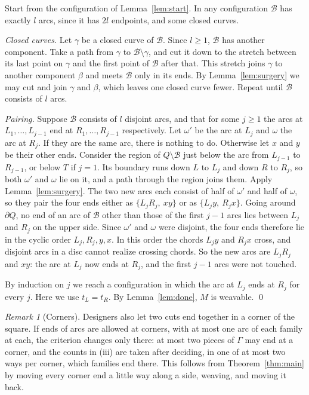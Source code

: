 \documentclass[11pt,a4paper]{article}
\theoremstyle{definition}
\theoremstyle{remark}
\newtheorem{remark}[theorem]{Remark}
\newcommand{\B}{\mathcal{B}}
\newcommand{\bd}{\partial}
\begin{document}
Start from the configuration of Lemma~\ref{lem:start}. In any
configuration $\B$ has exactly $l$ arcs, since it has $2l$ endpoints, and
some closed curves.

\emph{Closed curves.} Let $\gamma$ be a closed curve of $\B$. Since
$l\ge1$, $\B$ has another component. Take a path from $\gamma$ to
$\B\setminus\gamma$, and cut it down to the stretch between its last
point on $\gamma$ and the first point of $\B$ after that. This stretch
joins $\gamma$ to another component $\beta$ and meets $\B$ only in its
ends. By Lemma~\ref{lem:surgery} we may cut and join $\gamma$ and $\beta$,
which leaves one closed curve fewer. Repeat until $\B$ consists of $l$
arcs.

\emph{Pairing.} Suppose $\B$ consists of $l$ disjoint arcs, and that for
some $j\ge 1$ the arcs at $L_1,\dots,L_{j-1}$ end at
$R_1,\dots,R_{j-1}$ respectively. Let $\omega'$ be the arc at $L_j$ and
$\omega$ the arc at $R_j$. If they are the same arc, there is nothing to
do. Otherwise let $x$ and $y$ be their other ends. Consider the region of
$Q\setminus\B$ just below the arc from $L_{j-1}$ to $R_{j-1}$, or below $T$
if $j=1$. Its boundary runs down $L$ to $L_j$ and down $R$ to $R_j$, so
both $\omega'$ and $\omega$ lie on it, and a path through the region joins
them. Apply Lemma~\ref{lem:surgery}. The two new arcs each consist of half
of $\omega'$ and half of $\omega$, so they pair the four ends either as
$\{L_jR_j,\ xy\}$ or as $\{L_jy,\ R_jx\}$. Going around $\bd Q$, no end of
an arc of $\B$ other than those of the first $j-1$ arcs lies between $L_j$
and $R_j$ on the upper side. Since $\omega'$ and $\omega$ were disjoint, the
four ends therefore lie in the cyclic order $L_j,R_j,y,x$. In this order
the chords $L_jy$ and $R_jx$ cross, and disjoint arcs in a disc cannot
realize crossing chords. So the new arcs are $L_jR_j$ and $xy$: the arc at
$L_j$ now ends at $R_j$, and the first $j-1$ arcs were not touched.

By induction on $j$ we reach a configuration in which the arc at $L_j$
ends at $R_j$ for every $j$. Here we use $t_L=t_R$. By
Lemma~\ref{lem:done}, $M$ is weavable. \qed

\begin{remark}[Corners]
Designers also let two cuts end together in a corner of the square. If
ends of arcs are allowed at corners, with at most one arc of each family at
each, the criterion changes only there: at most two pieces of $\Gamma$ may
end at a corner, and the counts in (iii) are taken after deciding, in one
of at most two ways per corner, which families end there. This follows from
Theorem~\ref{thm:main} by moving every corner end a little way along a
side, weaving, and moving it back.
\end{remark}
\end{document}
